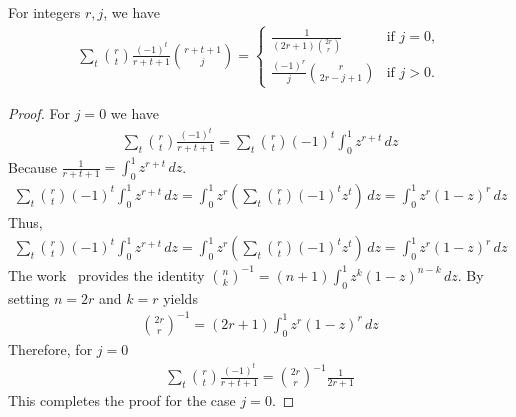 \begin{lemma}
    \label{lem:altering-binomial-identity}
    For integers $r, j$, we have
    \begin{align*}
        \sum_{t} \binom{r}{t} \frac{(-1)^t}{r+t+1} \binom{r+t+1}{j}
        = \begin{cases}
              \displaystyle \frac{1}{(2r+1) \binom{2r}{r}} & \text{if } j=0, \\[0.8em]
              \displaystyle \frac{(-1)^r}{j} \binom{r}{2r-j+1} & \text{if } j>0.
        \end{cases}
    \end{align*}
    \begin{proof}
        For $j=0$ we have
        \begin{align*}
            \sum_t \binom{r}{t} \frac{(-1)^t}{r+t+1} = \sum_t \binom{r}{t} (-1)^t \int_0^1 z^{r+t} \, dz
        \end{align*}
        Because $\frac{1}{r+t+1} = \int_0^1 z^{r+t} \, dz$.
        \begin{align*}
            \sum_t \binom{r}{t} (-1)^t \int_0^1 z^{r+t} \, dz
            = \int_0^1 z^r \left( \sum_t \binom{r}{t} (-1)^t z^{t} \right) \, dz
            = \int_0^1 z^r (1 - z)^r \, dz
        \end{align*}
        Thus,
        \begin{align*}
            \sum_t \binom{r}{t} (-1)^t \int_0^1 z^{r+t} \, dz
            = \int_0^1 z^r \left( \sum_t \binom{r}{t} (-1)^t z^{t} \right) \, dz
            = \int_0^1 z^r (1 - z)^r \, dz
        \end{align*}
        The work~\cite{sury2004identities} provides the identity $\binom{n}{k}^{-1}=(n+1)\int_0^1z^k(1-z)^{n-k}\,dz$.
        By setting $n=2r$ and $k=r$ yields
        \begin{align*}
            \binom{2r}{r}^{-1}=(2r+1) \int_0^1 z^r (1-z)^{r}\,dz
        \end{align*}
        Therefore, for $j=0$
        \begin{align*}
            \sum_t \binom{r}{t} \frac{(-1)^t}{r+t+1} = \binom{2r}{r}^{-1} \frac{1}{2r+1}
        \end{align*}
        This completes the proof for the case $j=0$.


\end{proof}
\end{lemma}
